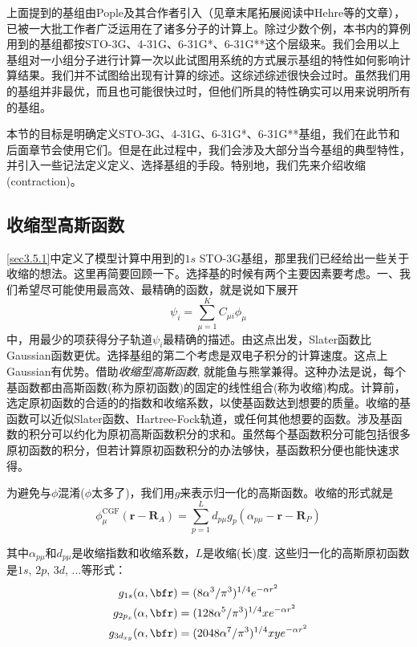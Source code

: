 上面提到的基组由Pople及其合作者引入（见章末尾拓展阅读中Hehre等的文章），已被一大批工作者广泛运用在了诸多分子的计算上。除过少数个例，本书内的算例用到的基组都按STO-3G、4-31G、6-31G*、6-31G**这个层级来。我们会用以上基组对一小组分子进行计算一次以此试图用系统的方式展示基组的特性如何影响计算结果。我们并不试图给出现有计算的综述。这综述综述很快会过时。虽然我们用的基组并非最优，而且也可能很快过时，但他们所具的特性确实可以用来说明所有的基组。

本节的目标是明确定义STO-3G、4-31G、6-31G*、6-31G**基组，我们在此节和后面章节会使用它们。但是在此过程中，我们会涉及大部分当今基组的典型特性，并引入一些记法定义定义、选择基组的手段。特别地，我们先来介绍收缩(contraction)。
\subsection{收缩型高斯函数}
\ref{sec3.5.1}中定义了模型计算中用到的$1s$ STO-3G基组，那里我们已经给出一些关于收缩的想法。这里再简要回顾一下。选择基的时候有两个主要因素要考虑。一、我们希望尽可能使用最高效、最精确的函数，就是说如下展开
\begin{equation}
\psi_i=\sum_{\mu=1}^{K}C_{\mu i}\phi_\mu
\end{equation}
中，用最少的项获得分子轨道$\psi_i$最精确的描述。由这点出发，Slater函数比Gaussian函数更优。选择基组的第二个考虑是双电子积分的计算速度。这点上Gaussian有优势。借助\emph{收缩型高斯函数}, 就能鱼与熊掌兼得。这种办法是说，每个基函数都由高斯函数(称为原初函数)的固定的线性组合(称为收缩)构成。计算前，选定原初函数的合适的的指数和收缩系数，以使基函数达到想要的质量。收缩的基函数可以近似Slater函数、Hartree-Fock轨道，或任何其他想要的函数。涉及基函数的积分可以约化为原初高斯函数积分的求和。虽然每个基函数积分可能包括很多原初函数的积分，但若计算原初函数积分的办法够快，基函数积分便也能快速求得。

为避免与$\phi$混淆($\phi$太多了)，我们用$g$来表示归一化的高斯函数。收缩的形式就是
\begin{equation}
\phi^\mathrm{CGF}_\mu(\mathbf{r-R}_A)=\sum_{p=1}^{L}d_{p\mu}g_p(\alpha_{p\mu}-\mathbf{r-R}_P)
\label{3.283}
\end{equation}

其中$\alpha_{p\mu}$和$d_{p\mu}$是收缩指数和收缩系数，$L$是收缩(长)度. 这些归一化的高斯原初函数是$1s$, $2p$, $3d$, ...等形式：
\begin{align}
g_{1s}(\alpha,\bfr)      & = (8\alpha^3/\pi^3)^{1/4}       e^{-\alpha r^2}\\
g_{2p_x}(\alpha,\bfr)    & = (128\alpha^5/\pi^3)^{1/4}  x  e^{-\alpha r^2}\\
g_{3d_{xy}}(\alpha,\bfr) & = (2048\alpha^7/\pi^3)^{1/4} xy e^{-\alpha r^2}
\end{align}

